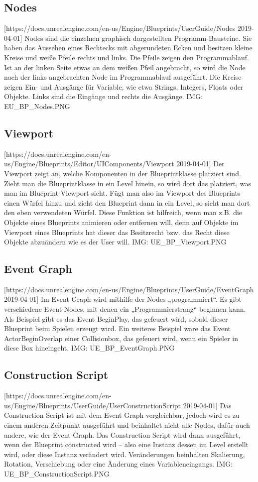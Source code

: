 \subsection{Nodes} [https://docs.unrealengine.com/en-us/Engine/Blueprints/UserGuide/Nodes 2019-04-01]
Nodes sind die einzelnen graphisch dargestellten Programm-Bausteine.
Sie haben das Aussehen eines Rechtecks mit abgerundeten Ecken und besitzen kleine Kreise und weiße Pfeile rechts und links.
Die Pfeile zeigen den Programmablauf.
Ist an der linken Seite etwas an dem weißen Pfeil angebracht, so wird die Node nach der links angebrachten Node im Programmablauf ausgeführt.
Die Kreise zeigen Ein- und Ausgänge für Variable, wie etwa Strings, Integers, Floats oder Objekte.
Links sind die Eingänge und rechts die Ausgänge.
{IMG: EU_BP_Nodes.PNG}
\subsection{Viewport} [https://docs.unrealengine.com/en-us/Engine/Blueprints/Editor/UIComponents/Viewport 2019-04-01]
Der Viewport zeigt an, welche Komponenten in der Blueprintklasse platziert sind.
Zieht man die Blueprintklasse in ein Level hinein, so wird dort das platziert, was man im Blueprint-Viewport sieht.
Fügt man also im Viewport des Blueprints einen Würfel hinzu und zieht den Blueprint dann in ein Level, so sieht man dort den eben verwendeten Würfel.
Diese Funktion ist hilfreich, wenn man z.B. die Objekte eines Blueprints animieren oder entfernen will, denn auf Objekte im Viewport eines Blueprints hat dieser das Besitzrecht bzw. das Recht diese Objekte abzuändern wie es der User will.
{IMG: UE_BP_Viewport.PNG}
\subsection{Event Graph} [https://docs.unrealengine.com/en-us/Engine/Blueprints/UserGuide/EventGraph 2019-04-01]
Im Event Graph wird mithilfe der Nodes „programmiert“.
Es gibt verschiedene Event-Nodes, mit denen ein „Programmierstrang“ beginnen kann.
Als Beispiel gibt es das Event BeginPlay, das gefeuert wird, sobald dieser Blueprint beim Spielen erzeugt wird.
Ein weiteres Beispiel wäre das Event ActorBeginOverlap einer Collisionbox, das gefeuert wird, wenn ein Spieler in diese Box hineingeht.
{IMG: UE_BP_EventGraph.PNG}
\subsection{Construction Script} [https://docs.unrealengine.com/en-us/Engine/Blueprints/UserGuide/UserConstructionScript 2019-04-01]
Das Construction Script ist mit dem Event Graph vergleichbar, jedoch wird es zu einem anderen Zeitpunkt ausgeführt und beinhaltet nicht alle Nodes, dafür auch andere, wie der Event Graph.
Das Construction Script wird dann ausgeführt, wenn der Blueprint constructed wird – also eine Instanz dessen im Level erstellt wird, oder diese Instanz verändert wird.
Veränderungen beinhalten Skalierung, Rotation, Verschiebung oder eine Änderung eines Variableneingangs.
{IMG: UE_BP_ConstructionScript.PNG}
